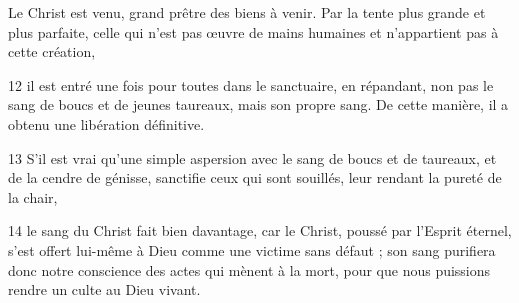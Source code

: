 Le Christ est venu, grand prêtre des biens à venir. Par la tente plus grande et plus parfaite, celle qui n’est pas œuvre de mains humaines et n’appartient pas à cette création,

12 il est entré une fois pour toutes dans le sanctuaire, en répandant, non pas le sang de boucs et de jeunes taureaux, mais son propre sang. De cette manière, il a obtenu une libération définitive.

13 S’il est vrai qu’une simple aspersion avec le sang de boucs et de taureaux, et de la cendre de génisse, sanctifie ceux qui sont souillés, leur rendant la pureté de la chair,

14 le sang du Christ fait bien davantage, car le Christ, poussé par l’Esprit éternel, s’est offert lui-même à Dieu comme une victime sans défaut ; son sang purifiera donc notre conscience des actes qui mènent à la mort, pour que nous puissions rendre un culte au Dieu vivant.
